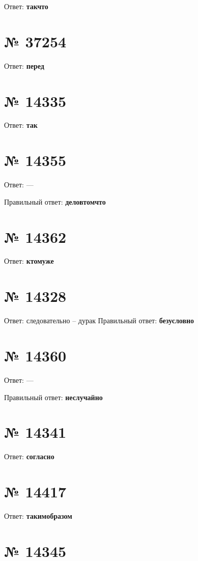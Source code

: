 \documentclass[11pt]{article} %
\begin{document}
Ответ: \textbf{такчто}

\section{№ \textbf{37254}}

Ответ: \textbf{перед}

\section{№ \textbf{14335}}

Ответ: \textbf{так}

\section{№ \textbf{14355}}

Ответ: ---

Правильный ответ: \textbf{деловтомчто}

\section{№ \textbf{14362}}

Ответ: \textbf{ктомуже}

\section{№ \textbf{14328}}

Ответ: следовательно -- дурак
Правильный ответ: \textbf{безусловно}

\section{№ \textbf{14360}}

Ответ: ---

Правильный ответ: \textbf{неслучайно}

\section{№ \textbf{14341}}

Ответ: \textbf{согласно}

\section{№ \textbf{14417}}

Ответ: \textbf{такимобразом}

\section{№ \textbf{14345}}
\end{document}

